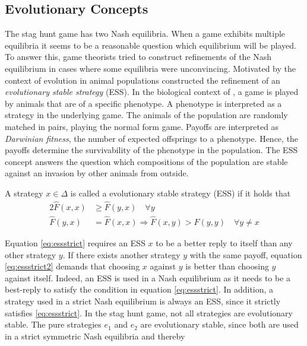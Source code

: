 \subsection{Evolutionary Concepts}
The stag hunt game has two Nash equilibria. When a game exhibits 
multiple equilibria it seems to be a reasonable question 
which equilibrium will be played. To answer this, 
game theorists tried to construct refinements 
of the Nash equilibrium in cases where some equilibria were unconvincing. 
Motivated by the context of evolution in animal populations 
\textcite{smith_lhe_1973} constructed the refinement of an 
\textit{evolutionary stable strategy} (ESS).  
In the biological context of \textcite{smith_lhe_1973}, a game is played 
by animals that are of a specific phenotype. A phenotype is interpreted
as a strategy in the underlying game. The animals of the population are randomly
matched in pairs, playing the normal form game. Payoffs are interpreted as
\textit{Darwinian fitness}, the number of expected offsprings to a phenotype.
Hence, the payoffs determine the survivability of the phenotype in the 
population.
The ESS concept answers the question which compositions of the population are
stable against an invasion by other animals from outside.
\begin{mydef}
        \label{def:ess}
        A strategy $x \in \Delta$ is called a evolutionary stable strategy 
        (ESS) if it holds that
        \begin{alignat}{2}
                \label{eq:essstrict}
                \hat{F}(x,x) &\geq \hat{F}(y,x) \quad \forall y \\ 
                \hat{F}(y,x) &= \hat{F}(x,x) \Rightarrow  
                \hat{F}(x,y) > \hat{F}(y,y) \quad \forall y \neq x \label{eq:essstrict2}
        \end{alignat}
\end{mydef}
Equation \eqref{eq:essstrict}
requires an ESS $x$ to be a better reply to itself than any other strategy $y$.
If there exists another strategy $y$ with the same payoff, equation 
\eqref{eq:essstrict2} demands that choosing $x$ against $y$ is better 
than choosing $y$ against itself.
Indeed, an ESS is used in a 
Nash equilibrium as it needs to be a best-reply to satisfy the 
condition in equation \eqref{eq:essstrict}. 
In addition, a strategy used in a strict 
Nash equilibrium is always an ESS, since it strictly satisfies 
\eqref{eq:essstrict}. 
In the stag hunt game, not all strategies are evolutionary stable.
The pure strategies $e_1$ and $e_2$ are evolutionary stable,
since both are used in a strict symmetric Nash equilibria and thereby 
